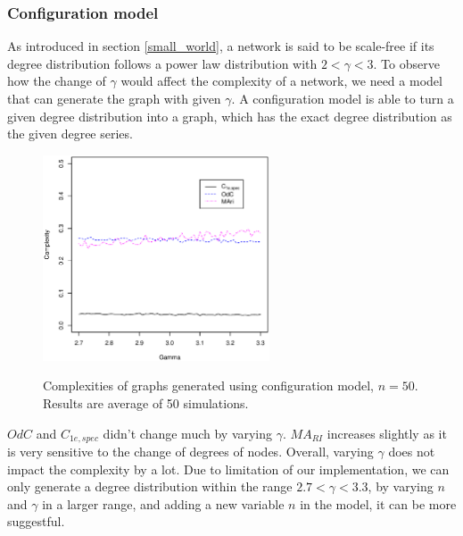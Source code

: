 \documentclass[12pt]{article}
\begin{document}
{\subsubsection{Configuration model}
\label{configuration_model}
As introduced in section \ref{small_world}, a network is said to be scale-free if its degree distribution follows a power law distribution with $2<\gamma <3$. To observe how the change of $\gamma$ would affect the complexity of a network, we need a model that can generate the graph with given $\gamma$. A configuration model \cite{newmanbook} is able to turn a given degree distribution into a graph, which has the exact degree distribution as the given degree series. 
\begin{figure}[h]
    \centering
    \includegraphics[width=0.6\textwidth]{configuration_model.eps}
    \label{fig:configuration_model}
    \caption{Complexities of graphs generated using configuration model, $n=50$. Results are average of 50 simulations.}
\end{figure}
\noindent
$OdC$ and $C_{1e,spec}$ didn't change much by varying $\gamma$. $MA_{RI}$ increases slightly as it is very sensitive to the change of degrees of nodes. Overall, varying $\gamma$ does not impact the complexity by a lot. Due to limitation of our implementation, we can only generate a degree distribution within the range $2.7<\gamma<3.3$, by varying $n$ and $\gamma$ in a larger range, and adding a new variable $n$ in the model, it can be more suggestful. 

}
\end{document}
